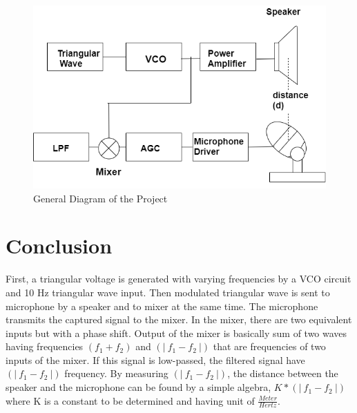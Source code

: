 \documentclass[paper]{IEEEtran}
\begin{document}
\begin{figure}[h!]
\setlength{\unitlength}{\textwidth}
\center 
\includegraphics[width=0.5\unitlength]{diagram3.png}
\caption{\label{fig:diagram}General Diagram of the Project }
\end{figure}	

\vfill

\section{Conclusion}

	First, a triangular voltage is generated with varying frequencies by a VCO circuit and 10 Hz triangular wave input. Then modulated triangular wave is sent to microphone by a speaker and to mixer at the same time. The microphone transmits the captured signal to the mixer. In the mixer, there are two equivalent inputs but with a phase shift. Output of the mixer is basically sum of two waves having frequencies $ (f_1+f_2)$ and $(|~f_1 -f_2~|) $ that are frequencies of two inputs of the mixer. If this signal is low-passed, the filtered signal have $(|~f_1 -f_2~|) $ frequency. By measuring $(|~f_1 -f_2~|) $, the distance between the speaker and the microphone can be found by a simple algebra, $K*(|~f_1 -f_2~|) $ where K is a constant to be determined and having unit of $\frac{Meter}{Hertz} $.

 
\end{document}
